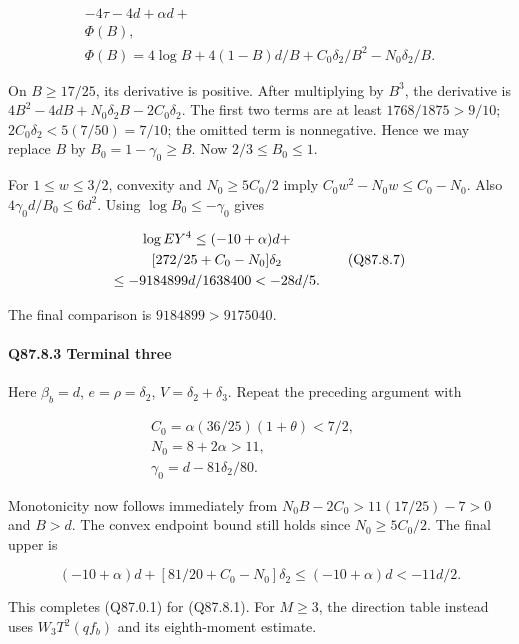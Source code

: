 \[
\begin{gathered}
-4\tau-4d+\alpha d+\\
\Phi(B),\quad\\
\Phi(B)=4\log B+4(1-B)d/B+C_0\delta_2/B^2-N_0\delta_2/B.
\end{gathered}
\]

On \(B\ge\allowbreak 17/25\), its derivative is positive. After multiplying
by \(B^3\), the derivative is
\(4B^2-4dB+N_0\delta_2B-2C_0\delta_2\).
The first two terms are at least \(1768/1875>\allowbreak 9/10\);
\(2C_0\delta_2<\allowbreak 5(7/50)=\allowbreak 7/10\); the omitted term is nonnegative.
Hence we may replace \(B\) by \(B_0=\allowbreak 1-\gamma_0\ge\allowbreak  B\).
Now \(2/3\le\allowbreak  B_0\le\allowbreak 1\).

For \(1\le\allowbreak  w\le\allowbreak 3/2\), convexity and \(N_0\ge\allowbreak 5C_0/2\) imply
\(C_0w^2-N_0w\le\allowbreak  C_0-N_0\).
Also \(4\gamma_0d/B_0\le\allowbreak 6d^2\). Using
\(\log B_0\le\allowbreak -\gamma_0\) gives

\[
\begin{gathered}
\log EY^4\le(-10+\alpha)d+\\
\relax [272/25+C_0-N_0]\delta_2\\
\le-9184899d/1638400<-28d/5.
\end{gathered}\tag{Q87.8.7}\label{eq:Q87:8.7}
\]

The final comparison is \(9184899>\allowbreak 9175040\).


\paragraph{Q87.8.3 Terminal three}\label{part:Q87.8.3}

Here \(\beta_b=\allowbreak d\), \(e=\allowbreak \rho=\allowbreak \delta_2\), \(V=\allowbreak \delta_2+\delta_3\).
Repeat the preceding argument with

\[
\begin{gathered}
C_0=\alpha(36/25)(1+\theta)<7/2,\quad\\
N_0=8+2\alpha>11,\quad\\
\gamma_0=d-81\delta_2/80.
\end{gathered}
\]

Monotonicity now follows immediately from
\(N_0B-2C_0>\allowbreak 11(17/25)-7>\allowbreak 0\) and \(B>\allowbreak d\).
The convex endpoint bound still holds since \(N_0\ge\allowbreak 5C_0/2\).
The final upper is

\[
 (-10+\alpha)d+[81/20+C_0-N_0]\delta_2
 \le(-10+\alpha)d<-11d/2.
\]

This completes (Q87.0.1) for (Q87.8.1). For \(M\ge\allowbreak 3\), the direction table instead uses \(W_3T^2(qf_b)\) and its eighth-moment estimate.

